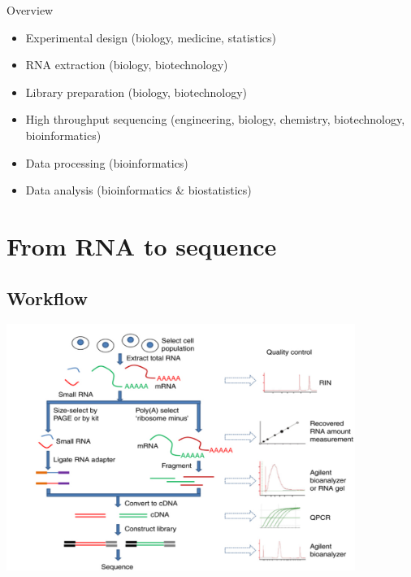 \documentclass{beamer}\usepackage[]{graphicx}\usepackage[]{color}
\begin{document}
\begin{frame}
\begin{block}{Overview}
\begin{itemize}
\item \color{blue} Experimental design \color{black}(biology, medicine, statistics)
\item \color{blue} RNA extraction \color{black}(biology, biotechnology)
\item \color{blue} Library preparation (\color{black}biology, biotechnology)
\item \color{blue} High throughput sequencing \color{black}(engineering, biology, chemistry, biotechnology, bioinformatics)
\item \color{red} Data processing \color{black} (bioinformatics)
\item \color{red} Data analysis \color{black} (bioinformatics \& biostatistics)
\end{itemize}
\end{block}
\end{frame}


\section{From RNA to sequence}
\subsection{Workflow}

\begin{frame}
\begin{center}
\includegraphics[height=8cm]{Images/RNA2seq.jpg}
\end{center}
\end{frame}
\end{document}
